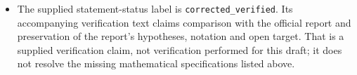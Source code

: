 \documentclass[11pt]{article}
\begin{document}
\begin{itemize}
\item The supplied statement-status label is \texttt{corrected\_verified}. Its accompanying verification text claims comparison with the official report and preservation of the report's hypotheses, notation and open target. That is a supplied verification claim, not verification performed for this draft; it does not resolve the missing mathematical specifications listed above.
\end{itemize}
\end{document}
